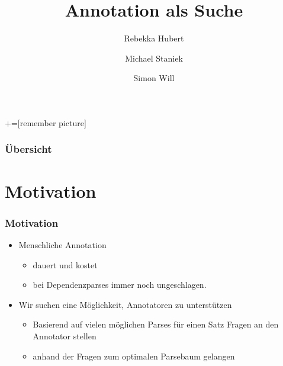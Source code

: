 \documentclass{beamer} %
\author{Rebekka Hubert \and Michael Staniek \and Simon Will}
\title{Annotation als Suche}
\begin{document}

+=[remember picture]

\everymath{\displaystyle}

\maketitle

\begin{frame}
    \frametitle{Übersicht}
    \tableofcontents
\end{frame}

\section{Motivation}

\begin{frame}
    \frametitle{Motivation}
    \begin{itemize}
        \item Menschliche Annotation
            \begin{itemize}
                \item dauert und kostet
                \item bei Dependenzparses immer noch ungeschlagen. %
            \end{itemize}
        \item Wir suchen eine Möglichkeit, Annotatoren zu unterstützen
            \begin{itemize}
                \item Basierend auf vielen möglichen Parses für einen Satz Fragen an den Annotator stellen
                \item anhand der Fragen zum optimalen Parsebaum gelangen
            \end{itemize}
    \end{itemize}
\end{frame}
\end{document}
